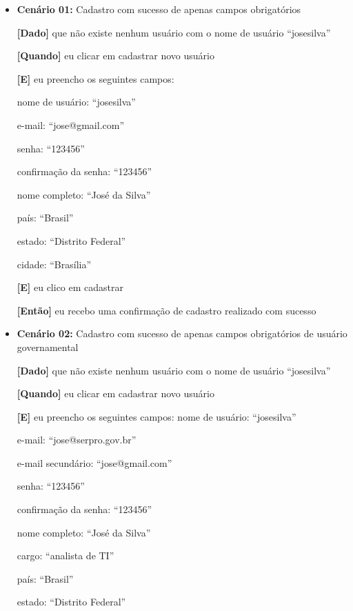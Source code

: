     \begin{itemize}
    \item\textbf{Cenário 01:} Cadastro com sucesso de apenas campos obrigatórios

    \textbf{[Dado]} que não existe nenhum usuário com o nome de usuário ``josesilva''

    \textbf{[Quando]} eu clicar em cadastrar novo usuário

    \textbf{[E]} eu preencho os seguintes campos: 

        \subitem nome de usuário: ``josesilva''

        \subitem e-mail: ``jose@gmail.com''

        \subitem senha: ``123456''

        \subitem confirmação da senha: ``123456''

        \subitem nome completo: ``José da Silva''

        \subitem país: ``Brasil''

        \subitem estado: ``Distrito Federal''

        \subitem cidade: ``Brasília''

    \textbf{[E]} eu clico em cadastrar

    \textbf{[Então]} eu recebo uma confirmação de cadastro realizado com sucesso


    \item\textbf{Cenário 02:} Cadastro com sucesso de apenas campos obrigatórios de usuário governamental
    
    \textbf{[Dado]} que não existe nenhum usuário com o nome de usuário ``josesilva''
    
    \textbf{[Quando]} eu clicar em cadastrar novo usuário
    
    \textbf{[E]} eu preencho os seguintes campos: 
        \subitem nome de usuário: ``josesilva''

        \subitem e-mail: ``jose@serpro.gov.br''

        \subitem e-mail secundário: ``jose@gmail.com''

        \subitem senha: ``123456''

        \subitem confirmação da senha: ``123456''

        \subitem nome completo: ``José da Silva''

        \subitem cargo: ``analista de TI''

        \subitem país: ``Brasil''

         \subitem estado: ``Distrito Federal''


\end{itemize}
